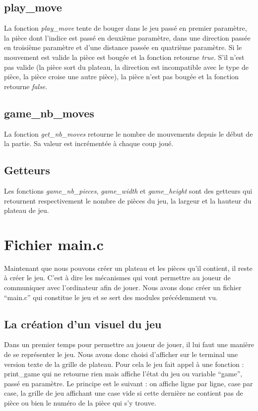 \documentclass{report}
\begin{document}
\subsection{play\_move}
\label{move}
La fonction \emph{play\_move} tente de bouger dans le jeu passé en premier paramètre, la pièce dont l'indice est passé en deuxième paramètre, dans une direction passée en troisième paramètre et d'une distance passée en quatrième paramètre. Si le mouvement est valide la pièce est bougée et la fonction retourne \emph{true}. S'il n'est pas valide (la pièce sort du plateau, la direction est incompatible avec le type de pièce, la pièce croise une autre pièce), la pièce n'est pas bougée et la fonction retourne \emph{false}.
\subsection{game\_nb\_moves}
La fonction \emph{get\_nb\_moves} retourne le nombre de mouvements depuis le début de la partie. Sa valeur est incrémentée à chaque coup joué.
\subsection{Getteurs}
Les fonctions \emph{game\_nb\_pieces}, \emph{game\_width} et \emph{game\_height} sont des getteurs qui retournent respectivement le nombre de pièces du jeu, la largeur et la hauteur du plateau de jeu.
\section{Fichier main.c}
Maintenant que nous pouvons créer un plateau et les pièces qu'il contient, il reste à créer le jeu. C'est à dire les mécanismes qui vont permettre au joueur de communiquer avec l'ordinateur afin de jouer. Nous avons donc créer un fichier ``main.c'' qui constitue le jeu et se sert des modules précédemment vu.
\subsection{La création d'un visuel du jeu}
\label{main}
Dans un premier temps pour permettre au joueur de jouer, il lui faut une manière de se représenter le jeu. Nous avons donc choisi d'afficher sur le terminal une version texte de la grille de plateau. Pour cela le jeu fait appel à une fonction : print\_game qui ne retourne rien mais affiche l'état du jeu ou variable ``game'', passé en paramètre. Le principe est le suivant : on affiche ligne par ligne, case par case, la grille de jeu affichant une case vide si cette dernière ne contient pas de pièce ou bien le numéro de la pièce qui s'y trouve.
\end{document}
